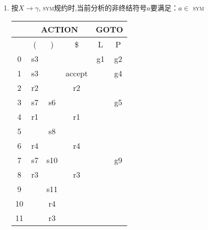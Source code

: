 \documentclass[a4paper, justified]{tufte-handout}
\begin{document}
\begin{solution}
\begin{enumerate}[(1)]
\begin{itemize}
\begin{tikzpicture}[->,>=stealth',shorten >=1pt,node distance=4cm,on grid,scale = 1, auto]
        \end{tikzpicture}
    \end{itemize}
    \item 按$X\to \gamma$, \textsc{sym}规约时,当前分析的非终结符号$a$要满足：$a\in$ \textsc{sym}\\
    \begin{tabular}{|c|c|c|c|c|c|}
        \hline
                                                   & \multicolumn{3}{c|}{ACTION} & \multicolumn{2}{c|}{GOTO} \\ \hline 
                                                   & (       & )       & \$       & L           & P           \\ \hline
        0                                          & s3      &         &         & g1          & g2          \\ \hline
        1                                          & s3      &         & accept     &             & g4          \\ \hline
        2                                          & r2      &         & r2      &             &             \\ \hline
        3                                          & s7      & s6      &         &             & g5          \\ \hline
        4                                          & r1      &         & r1      &             &             \\ \hline
        5                                          &         & s8      &         &             &             \\ \hline
        6                                          & r4      &         & r4      &             &             \\ \hline
        7                                          & s7      & s10     &         &             & g9          \\ \hline
        8                                          & r3      &         & r3      &             &             \\ \hline
        9                                          &         & s11     &         &             &             \\ \hline
        10                                         &         & r4      &         &             &             \\ \hline
        11                                         &         & r3      &         &             &             \\ \hline

\end{tabular}
\end{enumerate}
\end{solution}
\end{document}
